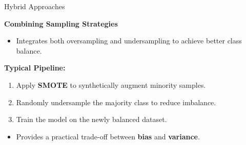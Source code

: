 \documentclass[serif, aspectratio=169]{beamer}
\begin{document}
    \begin{frame}{Hybrid Approaches}

        \textbf{Combining Sampling Strategies}

        \begin{itemize}\itemsep0.8em
        \item Integrates both oversampling and undersampling to achieve better class balance.
        \end{itemize}

        \vspace{0.5em}

        \textbf{Typical Pipeline:}
        \begin{enumerate}\itemsep0.6em
        \item Apply \textbf{SMOTE} to synthetically augment minority samples.
        \item Randomly undersample the majority class to reduce imbalance.
        \item Train the model on the newly balanced dataset.
        \end{enumerate}

        \vspace{0.6em}

        \begin{itemize}\itemsep0.6em
        \item Provides a practical trade-off between \textbf{bias} and \textbf{variance}.
        \end{itemize}

    \end{frame}
\end{document}
